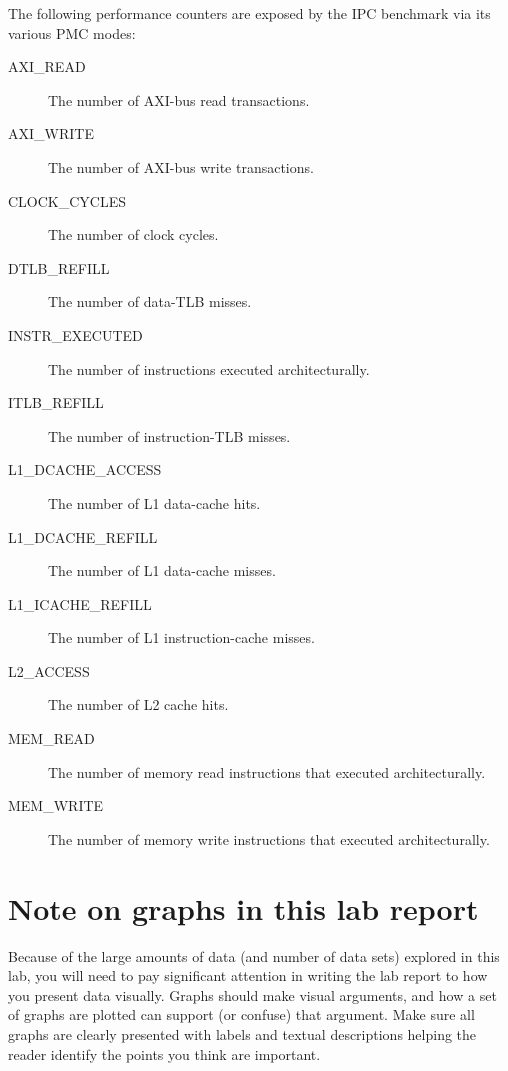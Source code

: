 \documentclass[a4paper,10pt]{article}
\begin{document}
The following performance counters are exposed by the IPC benchmark via its
various PMC modes:

\begin{description}

\item[AXI\_READ] The number of AXI-bus read transactions.

\item[AXI\_WRITE] The number of AXI-bus write transactions.

\item[CLOCK\_CYCLES] The number of clock cycles.

\item[DTLB\_REFILL] The number of data-TLB misses.

\item[INSTR\_EXECUTED] The number of instructions executed architecturally.

\item[ITLB\_REFILL] The number of instruction-TLB misses.

\item[L1\_DCACHE\_ACCESS] The number of L1 data-cache hits.

\item[L1\_DCACHE\_REFILL] The number of L1 data-cache misses.

\item[L1\_ICACHE\_REFILL] The number of L1 instruction-cache misses.

\item[L2\_ACCESS] The number of L2 cache hits.

\item[MEM\_READ] The number of memory read instructions that executed
  architecturally.

\item[MEM\_WRITE] The number of memory write instructions that executed
  architecturally.
\end{description}

\section*{Note on graphs in this lab report}

Because of the large amounts of data (and number of data sets) explored in
this lab, you will need to pay significant attention in writing the lab report
to how you present data visually.
Graphs should make visual arguments, and how a set of graphs are plotted can
support (or confuse) that argument.
Make sure all graphs are clearly presented with labels and textual
descriptions helping the reader identify the points you think are important.
\end{document}
